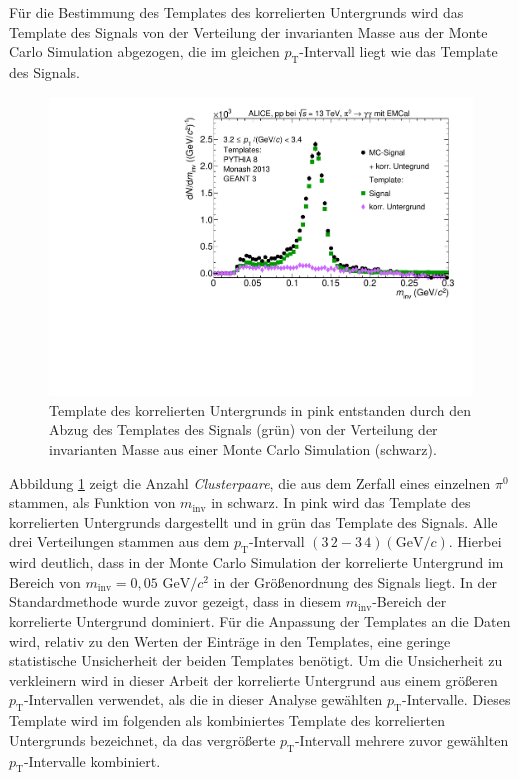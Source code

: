 Für die Bestimmung des Templates des korrelierten Untergrunds wird das Template des Signals von der Verteilung der invarianten Masse aus der Monte Carlo Simulation abgezogen, die im gleichen $p_\text{T}$-Intervall liegt wie das Template des Signals.
\begin{figure}[tp]
\centering
\includegraphics[width=.75\linewidth]{EntstehungUntergrund10_Data_2016.pdf}
\caption{Template des korrelierten Untergrunds in pink entstanden durch den Abzug des Templates des Signals (grün) von der Verteilung der invarianten Masse aus einer Monte Carlo Simulation (schwarz).}
\label{fig:BkgTemp}
\end{figure}
\newline
Abbildung \ref{fig:BkgTemp} zeigt die Anzahl \textit{Clusterpaare}, die aus dem Zerfall eines einzelnen $\pi^{0}$ stammen, als Funktion von $m_\text{inv}$ in schwarz.
In pink wird das Template des korrelierten Untergrunds dargestellt und in grün das Template des Signals.
Alle drei Verteilungen stammen aus dem $p_\text{T}$-Intervall $(3\,2 - 3\,4) (\text{GeV/}c)$.
Hierbei wird deutlich, dass in der Monte Carlo Simulation der korrelierte Untergrund im Bereich von $m_\text{inv} = 0,05 \text{ GeV/}c^{2}$ in der Größenordnung des Signals liegt.
In der Standardmethode wurde zuvor gezeigt, dass in diesem $m_\text{inv}$-Bereich der korrelierte Untergrund dominiert.
\newline
Für die Anpassung der Templates an die Daten wird, relativ zu den Werten der Einträge in den Templates, eine geringe statistische Unsicherheit der beiden Templates benötigt.
Um die Unsicherheit zu verkleinern wird in dieser Arbeit der korrelierte Untergrund aus einem größeren $p_\text{T}$-Intervallen verwendet, als die in dieser Analyse gewählten $p_\text{T}$-Intervalle.
Dieses Template wird im folgenden als kombiniertes Template des korrelierten Untergrunds bezeichnet, da das vergrößerte $p_\text{T}$-Intervall mehrere zuvor gewählten $p_\text{T}$-Intervalle kombiniert.
